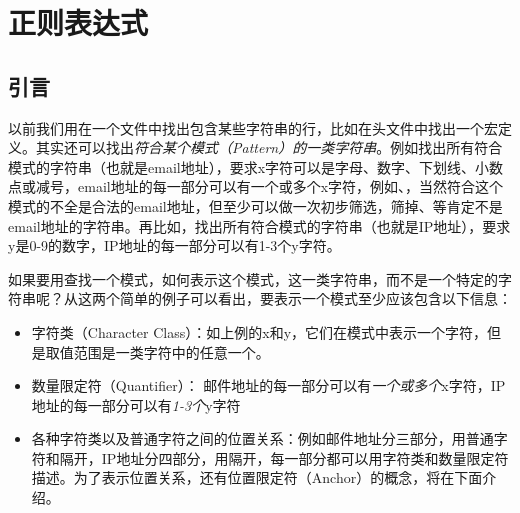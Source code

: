 

\chapter{正则表达式}
%





\section{引言}
%
以前我们用在一个文件中找出包含某些字符串的行，比如在头文件中找出一个宏定义。其实还可以找出\emph{符合某个模式（Pattern）的一类字符串}。例如找出所有符合模式的字符串（也就是email地址），要求x字符可以是字母、数字、下划线、小数点或减号，email地址的每一部分可以有一个或多个x字符，例如、，当然符合这个模式的不全是合法的email地址，但至少可以做一次初步筛选，筛掉、等肯定不是email地址的字符串。再比如，找出所有符合模式的字符串（也就是IP地址），要求y是0-9的数字，IP地址的每一部分可以有1-3个y字符。



如果要用查找一个模式，如何表示这个模式，这一类字符串，而不是一个特定的字符串呢？从这两个简单的例子可以看出，要表示一个模式至少应该包含以下信息：


\begin{itemize}

\item 字符类（Character Class）：如上例的x和y，它们在模式中表示一个字符，但是取值范围是一类字符中的任意一个。

\item 数量限定符（Quantifier）： 邮件地址的每一部分可以有\emph{一个或多个}x字符，IP地址的每一部分可以有\emph{1-3个}y字符

\item 各种字符类以及普通字符之间的位置关系：例如邮件地址分三部分，用普通字符和隔开，IP地址分四部分，用隔开，每一部分都可以用字符类和数量限定符描述。为了表示位置关系，还有位置限定符（Anchor）的概念，将在下面介绍。
\end{itemize}


